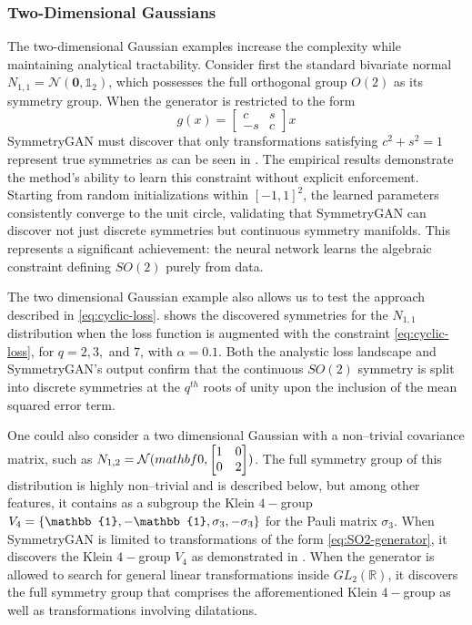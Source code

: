             \subsubsection{Two-Dimensional Gaussians}
                The two-dimensional Gaussian examples increase the complexity while maintaining analytical tractability.
                Consider first the standard bivariate normal \(N_{1, 1} = \mathcal{N}(\mathbf{0}, \mathbb{1}_2)\), which possesses the full orthogonal group \(O(2)\) as its symmetry group.
                When the generator is restricted to the form
                \[
                    \label{eq:SO2_generator}
                    g(x) = \begin{bmatrix} c & s \\ -s & c \end{bmatrix} x
                \]
                SymmetryGAN must discover that only transformations satisfying \(c^2 + s^2 = 1\) represent true symmetries as can be seen in .
                The empirical results demonstrate the method's ability to learn this constraint without explicit enforcement.
                Starting from random initializations within \([-1, 1]^2\), the learned parameters consistently converge to the unit circle, validating that SymmetryGAN can discover not just discrete symmetries but continuous symmetry manifolds.
                This represents a significant achievement: the neural network learns the algebraic constraint defining \(SO(2)\) purely from data.

                The two dimensional Gaussian example also allows us to test the approach described in \cref{eq:cyclic-loss}.
                 shows the discovered symmetries for the \(N_{1, 1}\) distribution when the loss function is augmented with the constraint \cref{eq:cyclic-loss}, for \(q = 2, 3,\) and \(7\), with \(\alpha = 0.1\).
                Both the analystic loss landscape and SymmetryGAN's output confirm that the continuous \(SO(2)\) symmetry is split into discrete symmetries at the \(q^{th}\) roots of unity upon the inclusion of the mean squared error term.

                One could also consider a two dimensional Gaussian with a non--trivial covariance matrix, such as \(N_{1, 2} = \mathcal{N}(mathbf{0}, \mqty[1&0\\0&2])\).
                The full symmetry group of this distribution is highly non--trivial and is described below, but among other features, it contains as a subgroup the Klein \(4-\)group \(V_4 = \qty{\mathbb{1}, -\mathbb{1}, \sigma_3, -\sigma_3}\) for the Pauli matrix \(\sigma_3\).
                When SymmetryGAN is limited to transformations of the form \cref{eq:SO2-generator}, it discovers the Klein \(4-\)group \(V_4\) as demonstrated in .
                When the generator is allowed to search for general linear transformations inside \(GL_2(\mathbb{R})\), it discovers the full symmetry group that comprises the afforementioned Klein \(4-\)group as well as transformations involving dilatations.

